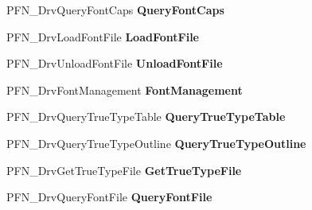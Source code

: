 \begin{DoxyCompactItemize}
\item 
\mbox{\label{struct___d_r_i_v_e_r___f_u_n_c_t_i_o_n_s_a0d7826a0e2e28092c187a38a0f7f0d0b}} 
P\+F\+N\+\_\+\+Drv\+Query\+Font\+Caps {\bfseries Query\+Font\+Caps}
\item 
\mbox{\label{struct___d_r_i_v_e_r___f_u_n_c_t_i_o_n_s_a58d1f12615bea9c5c63da973c43a761a}} 
P\+F\+N\+\_\+\+Drv\+Load\+Font\+File {\bfseries Load\+Font\+File}
\item 
\mbox{\label{struct___d_r_i_v_e_r___f_u_n_c_t_i_o_n_s_ab87ef1a27456e535159e47904718e135}} 
P\+F\+N\+\_\+\+Drv\+Unload\+Font\+File {\bfseries Unload\+Font\+File}
\item 
\mbox{\label{struct___d_r_i_v_e_r___f_u_n_c_t_i_o_n_s_a16e6c289cd1585448fe19a0610658dd2}} 
P\+F\+N\+\_\+\+Drv\+Font\+Management {\bfseries Font\+Management}
\item 
\mbox{\label{struct___d_r_i_v_e_r___f_u_n_c_t_i_o_n_s_af27ac9be8f6354c9622e0f9cccb6c623}} 
P\+F\+N\+\_\+\+Drv\+Query\+True\+Type\+Table {\bfseries Query\+True\+Type\+Table}
\item 
\mbox{\label{struct___d_r_i_v_e_r___f_u_n_c_t_i_o_n_s_aaf1e93c8022ec504dfc1c6d9f4011049}} 
P\+F\+N\+\_\+\+Drv\+Query\+True\+Type\+Outline {\bfseries Query\+True\+Type\+Outline}
\item 
\mbox{\label{struct___d_r_i_v_e_r___f_u_n_c_t_i_o_n_s_a51ef431e0cec1b8630de8036cc805b69}} 
P\+F\+N\+\_\+\+Drv\+Get\+True\+Type\+File {\bfseries Get\+True\+Type\+File}
\item 
\mbox{\label{struct___d_r_i_v_e_r___f_u_n_c_t_i_o_n_s_acb34823d86350309f2d3e20ca2c0365c}} 
P\+F\+N\+\_\+\+Drv\+Query\+Font\+File {\bfseries Query\+Font\+File}
\item 
\mbox{\label{struct___d_r_i_v_e_r___f_u_n_c_t_i_o_n_s_a87a195fdb559edbf7656efebfa829502}} 

\end{DoxyCompactItemize}
